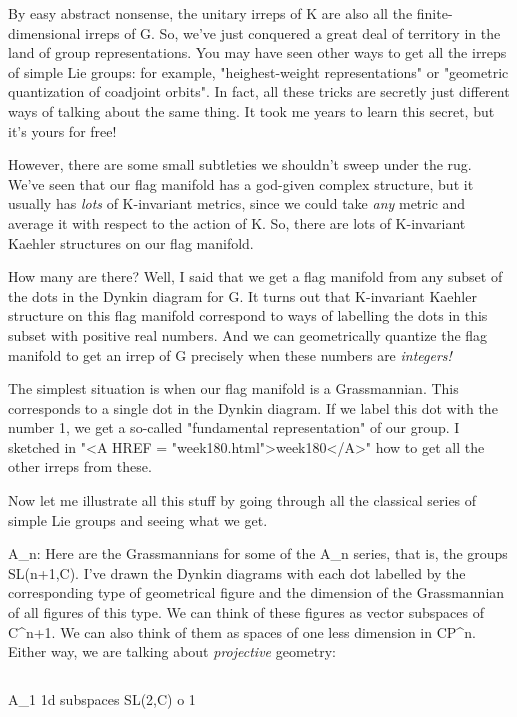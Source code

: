By easy abstract nonsense, the unitary irreps of K are also all the
finite-dimensional irreps of G.  So, we've just conquered a great deal
of territory in the land of group representations.  You may have seen
other ways to get all the irreps of simple Lie groups: for example,
"heighest-weight representations" or "geometric quantization of
coadjoint orbits".  In fact, all these tricks are secretly just
different ways of talking about the same thing.  It took me years 
to learn this secret, but it's yours for free!  

However, there are some small subtleties we shouldn't sweep under the
rug.  We've seen that our flag manifold has a god-given complex
structure, but it usually has \emph{lots} of K-invariant metrics, since we
could take \emph{any} metric and average it with respect to the action of K. 
So, there are lots of K-invariant Kaehler structures on our flag manifold.

How many are there?  Well, I said that we get a flag manifold from any
subset of the dots in the Dynkin diagram for G.  It turns out that
K-invariant Kaehler structure on this flag manifold correspond to ways
of labelling the dots in this subset with positive real numbers.  And 
we can geometrically quantize the flag manifold to get an irrep of G
precisely when these numbers are \emph{integers!}

The simplest situation is when our flag manifold is a Grassmannian.
This corresponds to a single dot in the Dynkin diagram.  If we label
this dot with the number 1, we get a so-called "fundamental
representation" of our group.  I sketched in "<A HREF = "week180.html">week180</A>" how to get all
the other irreps from these.

Now let me illustrate all this stuff by going through all the classical
series of simple Lie groups and seeing what we get.  

A_{n}: Here are the Grassmannians for some of the A_{n} series,
that is, the groups SL(n+1,C).  I've drawn the Dynkin diagrams with each
dot labelled by the corresponding type of geometrical figure and the
dimension of the Grassmannian of all figures of this type.  We can think
of these figures as vector subspaces of C^{n+1}.  We can also think of
them as spaces of one less dimension in CP^{n}.  Either way, we are
talking about \emph{projective} geometry:



$$

A_{1}                              1d subspaces
SL(2,C)                              o
                                     1


